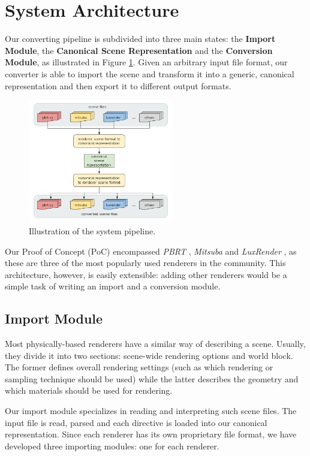 \section{System Architecture}
Our converting pipeline is subdivided into three main states: the \textbf{Import 
Module}, the \textbf{Canonical Scene Representation} and the \textbf{Conversion 
Module}, as illustrated in Figure \ref{fig:sysarch}. Given an arbitrary input 
file format, our converter is able to import the scene and transform it into a 
generic, canonical representation and then export it to different output 
formats. 

\begin{figure}[h]
\centering
\includegraphics[width=2.5in]{figs/3_system_architecture/architecture.png}
\caption{Illustration of the system pipeline.}
\label{fig:sysarch}
\end{figure}

Our Proof of Concept (PoC) encompassed \textit{PBRT} \cite{pbrt}, \textit{Mitsuba} 
\cite{mitsuba} and \textit{LuxRender} \cite{luxrender}, as these are three of 
the most popularly used renderers in the community. This architecture, however, 
is easily extensible: adding other renderers would be a simple task of writing 
an import and a conversion module.

\subsection{Import Module}
Most physically-based renderers have a similar way of describing a scene. 
Usually, they divide it into two sections: scene-wide rendering options and 
world block. The former defines overall rendering settings (such as which 
rendering or sampling technique should be used) while the latter describes the 
geometry and which materials should be used for rendering.

Our import module specializes in reading and interpreting such scene files. The 
input file is read, parsed and each directive is loaded into our canonical  
representation. Since each renderer has its own proprietary file format, we have 
developed three importing modules: one for each renderer.

